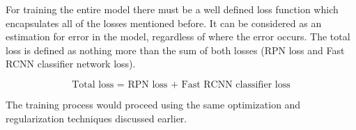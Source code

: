 For training the entire model there must be a well defined loss function which encapsulates all of the losses mentioned before. It can be considered as an estimation for error in the model, regardless of where the error occurs. The total loss is defined as nothing more than the sum of both losses (RPN loss and Fast RCNN classifier network loss).

\begin{equation}
  \text{Total loss = RPN loss + Fast RCNN classifier loss}
\end{equation}

The training process would proceed using the same optimization and regularization techniques discussed earlier.

%
